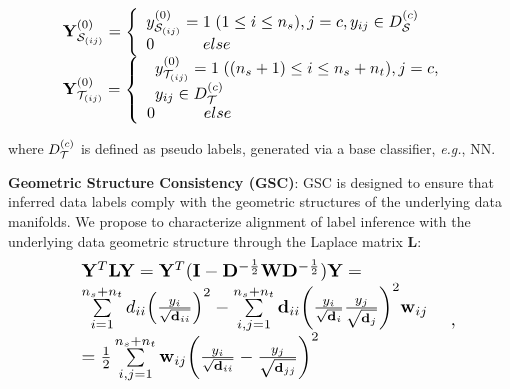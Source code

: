\documentclass[journal,twocolumn]{IEEEtran}
\begin{document}
\begin{CJK*}{UTF8}{gkai}
\begin{equation}\label{eq:labelconsistency1}
		\resizebox{0.85\hsize}{!}{%
	$\begin{array}{*{20}{l}}
	{{\bf{Y}}_{{{\cal S}_{(ij)}}}^{(0)} = \left\{ {\begin{array}{*{20}{l}}
	{y_{{{\cal S}_{(ij)}}}^{(0)} = 1\;(1 \le i \le {n_s}),j = c,{y_{ij}} \in D_{\cal S}^{(c)}}\\
	{0\;\;\;\;\;\;\;\;\;\;\;else}
 \end{array}} \right.}\\
	{{\bf{Y}}_{{{\cal T}_{(ij)}}}^{(0)} = \left\{ {\begin{array}{*{20}{l}}
	\begin{array}{l}
	y_{{{\cal T}_{(ij)}}}^{(0)} = 1\;(({n_s} + 1) \le i \le {n_s} + {n_t}),j = c,\\
	{y_{ij}} \in D_{\cal T}^{(c)}
	\end{array}\\
{0\;\;\;\;\;\;\;\;\;\;\;else}
	\end{array}} \right.}
	\end{array}$}
\end{equation}
	
 where	$D_{\cal T}^{(c)}$ is defined as pseudo labels,  generated via a base classifier, \textit{e.g.}, NN. 
	
								
\textbf{Geometric Structure Consistency (GSC)}:  GSC is designed to ensure that inferred data labels comply with the  geometric structures of the underlying data manifolds. We propose to characterize alignment of label inference with the underlying data geometric structure through the Laplace matrix $\textbf{L}$:
	\vspace{-1pt}
		\begin{equation}\label{eq:YLY}
        		\resizebox{0.85\hsize}{!}{%
					$\begin{array}{c}
										\begin{array}{l}
								\begin{array}{l}
{{\bf{Y}}^T}{\bf{L}}{\bf{Y}} = {{\bf{Y}}^T}({\bf{I}} - {{\bf{D}}^{ - \frac{1}{2}}}{\bf{W}}{{\bf{D}}^{ - \frac{1}{2}}}){\bf{Y}} = \\
\sum\limits_{i = 1}^{{n_s} + {n_t}} {{d_{ii}}{{\left( {\frac{{{y_i}}}{{\sqrt {{{\bf{d}}_{ii}}} }}} \right)}^2}}  - \sum\limits_{i,j = 1}^{{n_s} + {n_t}} {{{\bf{d}}_{ii}}{{\left( {\frac{{{y_i}}}{{\sqrt {{{\bf{d}}_i}} }}\frac{{{y_j}}}{{\sqrt {{{\bf{d}}_j}} }}} \right)}^2}} {{\bf{w}}_{ij}}\;\\
= \frac{1}{2}\sum\limits_{i,j = 1}^{{n_s} + {n_t}} {{{\bf{w}}_{ij}}{{\left( {\frac{{{y_i}}}{{\sqrt {{{\bf{d}}_{ii}}} }} - \frac{{{y_j}}}{{\sqrt {{{\bf{d}}_{jj}}} }}} \right)}^2}} 
\end{array}
\end{array},
\end{array}$}
\end{equation}



\end{CJK*}
\end{document}
